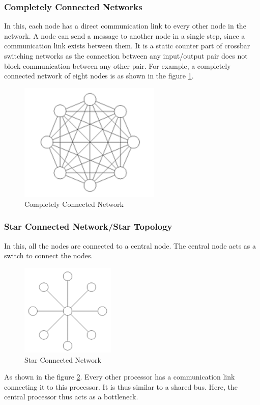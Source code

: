 \documentclass[12pt]{article}
\begin{document}
\subsubsection{Completely Connected Networks}
In this, each node has a direct communication link to every other node in the network. A node can send a message to another node
in a single step, since a communication link exists between them. 
It is a static counter part of crossbar switching networks as the connection between any input/output pair does not block communication between any other pair.
For example, a completely connected network of eight nodes is as shown in the figure \ref{fig:complete}.
\begin{figure}[H]
    \centering
    \includegraphics[width=0.6\textwidth]{images/completelyconnected.png}
    \caption{Completely Connected Network}
    \label{fig:complete}
\end{figure}

\subsubsection{Star Connected Network/Star Topology}
In this, all the nodes are connected to a central node. The central node acts as a switch to connect the nodes.
\begin{figure}[H]
    \centering
    \includegraphics[width=0.4\textwidth]{images/star.png}
    \caption{Star Connected Network}
    \label{fig:star}
\end{figure}
As shown in the figure \ref{fig:star}. Every other processor has a communication link connecting it to this processor. It is thus similar to 
a shared bus. Here, the central processor thus acts as a bottleneck.
\end{document}
